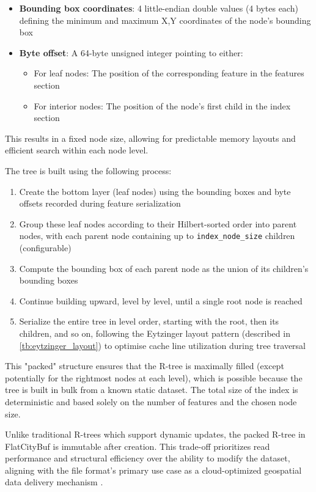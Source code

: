 \begin{itemize}
  \item \textbf{Bounding box coordinates}: 4 little-endian double values (4 bytes each) defining the minimum and maximum X,Y coordinates of the node's bounding box
  \item \textbf{Byte offset}: A 64-byte unsigned integer pointing to either:
    \begin{itemize}
      \item For leaf nodes: The position of the corresponding feature in the features section
      \item For interior nodes: The position of the node's first child in the index section
    \end{itemize}
\end{itemize}

This results in a fixed node size, allowing for predictable memory layouts and efficient search within each node level.

The tree is built using the following process:

\begin{enumerate}
  \item Create the bottom layer (leaf nodes) using the bounding boxes and byte offsets recorded during feature serialization
  \item Group these leaf nodes according to their Hilbert-sorted order into parent nodes, with each parent node containing up to \texttt{index\_node\_size} children (configurable)
  \item Compute the bounding box of each parent node as the union of its children's bounding boxes
  \item Continue building upward, level by level, until a single root node is reached
  \item Serialize the entire tree in level order, starting with the root, then its children, and so on, following the Eytzinger layout pattern (described in \autoref{tb:eytzinger_layout}) to optimise cache line utilization during tree traversal
\end{enumerate}

This "packed" structure ensures that the R-tree is maximally filled (except potentially for the rightmost nodes at each level), which is possible because the tree is built in bulk from a known static dataset. The total size of the index is deterministic and based solely on the number of features and the chosen node size.

Unlike traditional R-trees which support dynamic updates, the packed R-tree in FlatCityBuf is immutable after creation. This trade-off prioritizes read performance and structural efficiency over the ability to modify the dataset, aligning with the file format's primary use case as a cloud-optimized geospatial data delivery mechanism \citep{horance_2022_overview}.

